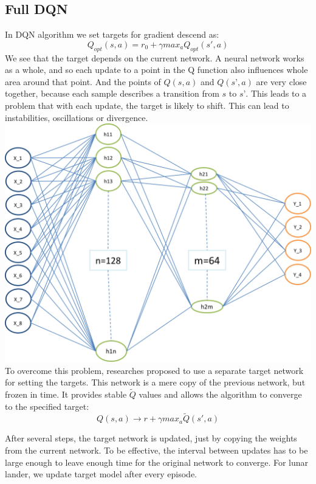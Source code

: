 \subsection{Full DQN}
In DQN algorithm we set targets for gradient descend as:
\begin{equation}
Q_{opt}(s,a) = r_{0} + \gamma max_{a}Q_{opt}(s',a)
\end{equation}
We see that the target depends on the current network. A neural network works as a whole, and so each update to a point in the Q function also influences whole area around that point. And the points of $Q(s, a)$ and $Q(s’, a)$ are very close together, because each sample describes a transition from $s$ to $s’$. This leads to a problem that with each update, the target is likely to shift. This can lead to instabilities, oscillations or divergence.
\newline
\includegraphics[scale=0.75,width=0.75\columnwidth]{figures/NN.png}%
\newline
To overcome this problem, researches proposed to use a separate target network for setting the targets. This network is a mere copy of the previous network, but frozen in time. It provides stable $\tilde{Q}$ values and allows the algorithm to converge to the specified target:
\begin{equation}
Q(s, a) \xrightarrow{} r + \gamma max_a \tilde{Q}(s', a)
\end{equation}

After several steps, the target network is updated, just by copying the weights from the current network. To be effective, the interval between updates has to be large enough to leave enough time for the original network to converge. \newline
For lunar lander, we update target model after every episode.

